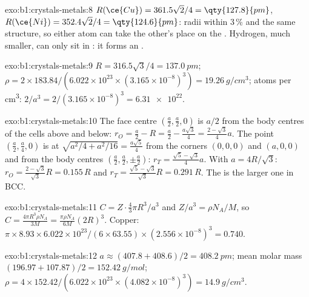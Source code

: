 \begin{solution}{exo:b1:crystals-metals:8}
$R(\ce{Cu}) = 361.5\sqrt2/4 = \qty{127.8}{pm}$, $R(\ce{Ni}) = 352.4\sqrt2/4
= \qty{124.6}{pm}$: radii within 3\,\% and the same structure, so either
atom can take the other's place on the . Hydrogen, much smaller,
can only sit in : it forms an .
\end{solution}

\begin{solution}{exo:b1:crystals-metals:9}
$R = 316.5\sqrt3/4 = \qty{137.0}{pm}$; $\rho = 2 \times 183.84/(6.022 \times
10^{23} \times (3.165 \times 10^{-8})^3) = \qty{19.26}{g/cm^3}$; atoms per
\unit{cm^3}: $2/a^3 = 2/(3.165 \times 10^{-8})^3 = \num{6.31e22}$.
\end{solution}

\begin{solution}{exo:b1:crystals-metals:10}
The face centre $(\frac a2,\frac a2,0)$ is $a/2$ from the body centres of
the cells above and below: $r_O = \frac a2 - R = \frac a2 - \frac{a\sqrt3}{4}
= \frac{2-\sqrt3}{4}a$. The point $(\frac a2,\frac a4,0)$ is at
$\sqrt{a^2/4 + a^2/16} = \frac{a\sqrt5}{4}$ from the corners $(0,0,0)$ and
$(a,0,0)$ and from the body centres $(\frac a2,\frac a2,\pm\frac a2)$:
$r_T = \frac{\sqrt5 - \sqrt3}{4}a$. With $a = 4R/\sqrt3$:
$r_O = \frac{2-\sqrt3}{\sqrt3}R = 0.155\,R$ and
$r_T = \frac{\sqrt5-\sqrt3}{\sqrt3}R = 0.291\,R$. The  is the
larger one in BCC.
\end{solution}

\begin{solution}{exo:b1:crystals-metals:11}
$C = Z\cdot\frac43\pi R^3/a^3$ and $Z/a^3 = \rho N_A/M$, so $C =
\frac{4\pi R^3\rho N_A}{3M} = \frac{\pi\rho N_A}{6M}(2R)^3$. Copper:
$\pi \times 8.93 \times 6.022 \times 10^{23}/(6 \times 63.55) \times (2.556
\times 10^{-8})^3 = 0.740$.
\end{solution}

\begin{solution}{exo:b1:crystals-metals:12}
$a \approx (407.8 + 408.6)/2 = \qty{408.2}{pm}$; mean molar mass $(196.97 +
107.87)/2 = \qty{152.42}{g/mol}$; $\rho = 4 \times 152.42/(6.022 \times
10^{23} \times (4.082 \times 10^{-8})^3) = \qty{14.9}{g/cm^3}$.
\end{solution}

